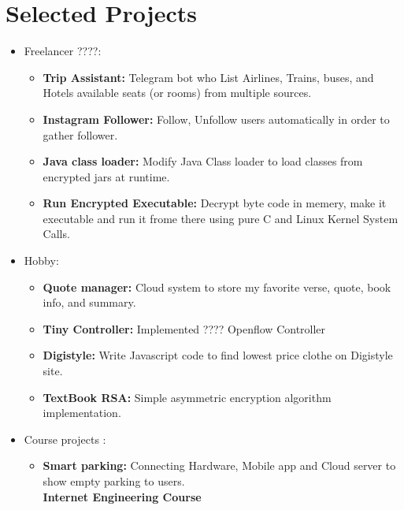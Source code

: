 \documentclass[a4paper,10pt]{article} %
\begin{document}
\color{blue}
\section{Selected Projects}
\color{Black}
\begin{itemize}
	\item \textcolor{blue(ryb)}{Freelancer} ????:
		\begin{itemize}
			\item 
				\textbf {Trip Assistant:} Telegram bot who List Airlines, Trains, buses, and Hotels available seats (or rooms) from multiple sources.
			\item
				\textbf {Instagram Follower:} Follow, Unfollow users automatically in order to gather follower.
			\item
				\textbf{Java class loader:} Modify Java Class loader to load classes from encrypted jars at runtime.
			\item
				\textbf{Run Encrypted Executable:} Decrypt byte code in memery, make it executable and run it frome there using pure C and Linux Kernel System Calls. \\
			
		\end{itemize}
	
	\item \textcolor{blue(ryb)}{Hobby}:
		\begin{itemize}
			\item
			\textbf {Quote manager:} Cloud system to store my favorite verse, quote, book info, and summary.
			
			\item 
				\textbf{Tiny Controller:} Implemented ???? Openflow Controller
							
			\item 
				\textbf{Digistyle:} Write Javascript code to find lowest price clothe on Digistyle site.
				
			\item 
				\textbf{TextBook RSA:} Simple asymmetric encryption algorithm implementation. \\
			
		\end{itemize}
	
	\item \textcolor{blue(ryb)}{Course projects} :
	\begin{itemize}
		\item
			\textbf{Smart parking:} Connecting Hardware, Mobile app and Cloud server to show empty parking to users. \\
			\textbf {Internet Engineering Course}
		

\end{itemize}
\end{itemize}
\end{document}
